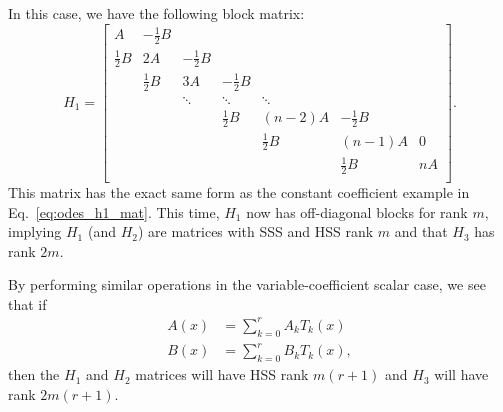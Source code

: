 In this case, we have the following block matrix:
%
\begin{equation}
    H_{1} = \begin{bmatrix}
        A               & -\frac{1}{2}B         & \\
        \frac{1}{2}B & 2A & -\frac{1}{2}B \\
        & \frac{1}{2}B & 3A & -\frac{1}{2}B \\
        & & \ddots & \ddots & \ddots \\
        & & & \frac{1}{2}B & (n-2)A & -\frac{1}{2}B \\
        & & & & \frac{1}{2}B & (n-1)A & 0 \\ 
        & & & & & \frac{1}{2}B & nA \\
    \end{bmatrix}.
\end{equation}
%
This matrix has the exact same form as the constant coefficient
example in Eq.~\eqref{eq:odes_h1_mat}.
This time, $H_{1}$ now has off-diagonal blocks for rank $m$,
implying $H_{1}$ (and $H_{2}$) are matrices with SSS and HSS rank $m$
and that $H_{3}$ has rank $2m$.

By performing similar operations in the variable-coefficient
scalar case, we see that if
%
\begin{align}
    A(x) &= \sum_{k=0}^{r} A_{k}T_{k}(x) \nonumber\\
    B(x) &= \sum_{k=0}^{r} B_{k}T_{k}(x),
    \label{eq:odes_systems_coefs}
\end{align}
%
then the $H_{1}$ and $H_{2}$ matrices will have HSS rank $m(r+1)$
and $H_{3}$ will have rank $2m(r+1)$.




